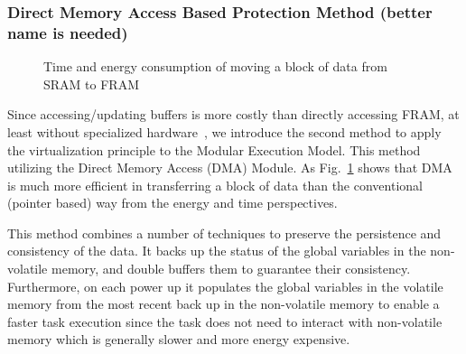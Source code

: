 \subsubsection{ Direct Memory Access Based Protection Method (better name is needed)}
%
\begin{figure}[t]
	\centering
	\caption{Time and energy consumption of moving a block of data from SRAM to FRAM}
	\label{fig:dmaTimeEnergy}
\end{figure}
%
Since accessing/updating buffers is more costly than directly accessing FRAM, at least without specialized hardware~\cite{clank}, we introduce the second method to apply the virtualization principle to the Modular Execution Model. This method utilizing the Direct Memory Access (DMA) Module. As Fig.~\ref{fig:dmaTimeEnergy} shows that DMA is much more efficient in transferring a block of data than the conventional (pointer based) way from the energy and time perspectives. 

This method combines a number of techniques to preserve the persistence and consistency of the data. It backs up the status of the global variables in the non-volatile memory, and double buffers them to guarantee their consistency. Furthermore, on each power up it populates the global variables in the volatile memory from the most recent back up in the non-volatile memory to enable a faster task execution since the task does not need to interact with non-volatile memory which is generally slower and more energy expensive.   

